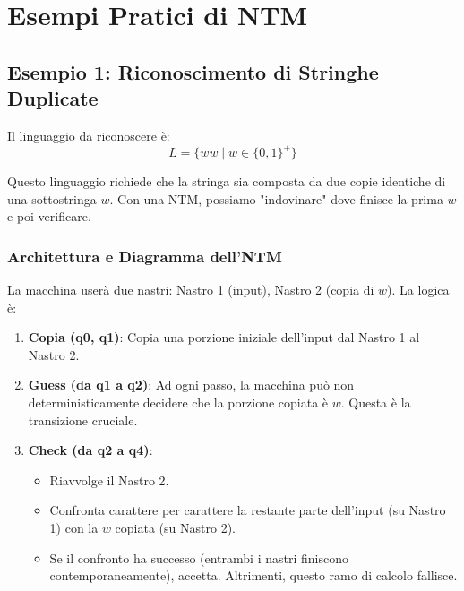 \documentclass[a4paper]{article}
\begin{document}
\section{Esempi Pratici di NTM}

\subsection{Esempio 1: Riconoscimento di Stringhe Duplicate}

Il linguaggio da riconoscere è:
\begin{equation}
L = \{ww \mid w \in \{0,1\}^+\}
\end{equation}

Questo linguaggio richiede che la stringa sia composta da due copie identiche di una sottostringa $w$. Con una NTM, possiamo "indovinare" dove finisce la prima $w$ e poi verificare.

\subsubsection{Architettura e Diagramma dell'NTM}
La macchina userà due nastri: Nastro 1 (input), Nastro 2 (copia di $w$).
La logica è:
\begin{enumerate}
    \item \textbf{Copia (q0, q1)}: Copia una porzione iniziale dell'input dal Nastro 1 al Nastro 2.
    \item \textbf{Guess (da q1 a q2)}: Ad ogni passo, la macchina può non deterministicamente decidere che la porzione copiata è $w$. Questa è la transizione cruciale.
    \item \textbf{Check (da q2 a q4)}:
    \begin{itemize}
        \item Riavvolge il Nastro 2.
        \item Confronta carattere per carattere la restante parte dell'input (su Nastro 1) con la $w$ copiata (su Nastro 2).
        \item Se il confronto ha successo (entrambi i nastri finiscono contemporaneamente), accetta. Altrimenti, questo ramo di calcolo fallisce.
    \end{itemize}
\end{enumerate}
\end{document}
